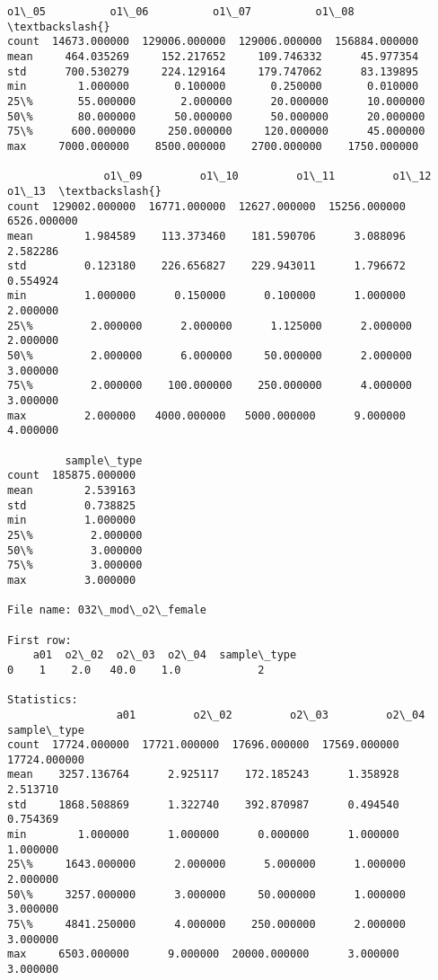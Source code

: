 \documentclass[11pt]{article}
\begin{document}
\begin{Verbatim}[commandchars=\\\{\}]
              o1\_05          o1\_06          o1\_07          o1\_08  \textbackslash{}
count  14673.000000  129006.000000  129006.000000  156884.000000   
mean     464.035269     152.217652     109.746332      45.977354   
std      700.530279     224.129164     179.747062      83.139895   
min        1.000000       0.100000       0.250000       0.010000   
25\%       55.000000       2.000000      20.000000      10.000000   
50\%       80.000000      50.000000      50.000000      20.000000   
75\%      600.000000     250.000000     120.000000      45.000000   
max     7000.000000    8500.000000    2700.000000    1750.000000   

               o1\_09         o1\_10         o1\_11         o1\_12        o1\_13  \textbackslash{}
count  129002.000000  16771.000000  12627.000000  15256.000000  6526.000000   
mean        1.984589    113.373460    181.590706      3.088096     2.582286   
std         0.123180    226.656827    229.943011      1.796672     0.554924   
min         1.000000      0.150000      0.100000      1.000000     2.000000   
25\%         2.000000      2.000000      1.125000      2.000000     2.000000   
50\%         2.000000      6.000000     50.000000      2.000000     3.000000   
75\%         2.000000    100.000000    250.000000      4.000000     3.000000   
max         2.000000   4000.000000   5000.000000      9.000000     4.000000   

         sample\_type  
count  185875.000000  
mean        2.539163  
std         0.738825  
min         1.000000  
25\%         2.000000  
50\%         3.000000  
75\%         3.000000  
max         3.000000  

File name: 032\_mod\_o2\_female

First row: 
    a01  o2\_02  o2\_03  o2\_04  sample\_type
0    1    2.0   40.0    1.0            2

Statistics: 
                 a01         o2\_02         o2\_03         o2\_04   sample\_type
count  17724.000000  17721.000000  17696.000000  17569.000000  17724.000000
mean    3257.136764      2.925117    172.185243      1.358928      2.513710
std     1868.508869      1.322740    392.870987      0.494540      0.754369
min        1.000000      1.000000      0.000000      1.000000      1.000000
25\%     1643.000000      2.000000      5.000000      1.000000      2.000000
50\%     3257.000000      3.000000     50.000000      1.000000      3.000000
75\%     4841.250000      4.000000    250.000000      2.000000      3.000000
max     6503.000000      9.000000  20000.000000      3.000000      3.000000


\end{Verbatim}
\end{document}
